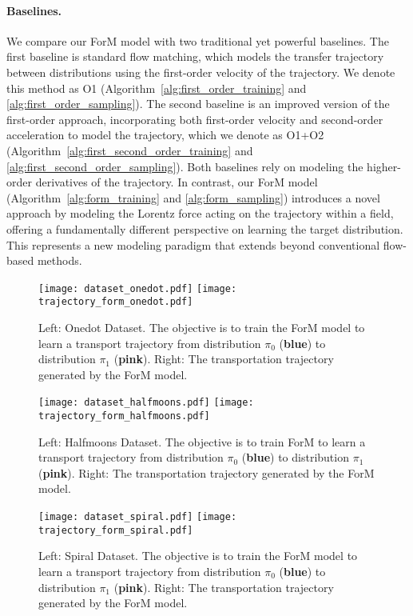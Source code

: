 \paragraph{Baselines.} We compare our ForM model with two traditional yet powerful baselines. The first baseline is standard flow matching, which models the transfer trajectory between distributions using the first-order velocity of the trajectory. We denote this method as O1 (Algorithm~\ref{alg:first_order_training} and \ref{alg:first_order_sampling}). The second baseline is an improved version of the first-order approach, incorporating both first-order velocity and second-order acceleration to model the trajectory, which we denote as O1+O2 (Algorithm~\ref{alg:first_second_order_training} and \ref{alg:first_second_order_sampling}). Both baselines rely on modeling the higher-order derivatives of the trajectory. In contrast, our ForM model (Algorithm~\ref{alg:form_training} and \ref{alg:form_sampling}) introduces a novel approach by modeling the Lorentz force acting on the trajectory within a field, offering a fundamentally different perspective on learning the target distribution. This represents a new modeling paradigm that extends beyond conventional flow-based methods.


\begin{figure}[!ht]
\centering
\texttt{[image: dataset\_onedot.pdf]} 
\texttt{[image: trajectory\_form\_onedot.pdf]}
\caption{Left: Onedot Dataset. The objective is to train the ForM model to learn a transport trajectory from distribution $\pi_0$ ({\textbf{blue}}) to distribution $\pi_1$ ({\textbf{pink}}). Right: The transportation trajectory generated by the ForM model.}
\label{fig:onedot_dataset}
\ifdefined\isarxiv
\else
\Description{}
\fi
\end{figure}


\begin{figure}[!ht]
\centering
\texttt{[image: dataset\_halfmoons.pdf]}
\texttt{[image: trajectory\_form\_halfmoons.pdf]} 
\caption{Left: Halfmoons Dataset. The objective is to train ForM to learn a transport trajectory from distribution $\pi_0$ ({\textbf{blue}}) to distribution $\pi_1$ ({\textbf{pink}}). Right: The transportation trajectory generated by the ForM model.}
\label{fig:halfmoons_dataset}
\ifdefined\isarxiv
\else
\Description{}
\fi
\end{figure}

\begin{figure}[!ht]
\centering
\texttt{[image: dataset\_spiral.pdf]}
\texttt{[image: trajectory\_form\_spiral.pdf]}
\caption{Left: Spiral Dataset. The objective is to train the ForM model to learn a transport trajectory from distribution $\pi_0$ ({\textbf{blue}}) to distribution $\pi_1$ ({\textbf{pink}}). Right: The transportation trajectory generated by the ForM model.}
\label{fig:spiral_dataset}
\ifdefined\isarxiv
\else
\Description{}
\fi
\end{figure}


